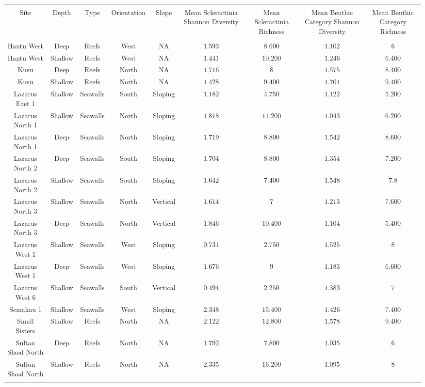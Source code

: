 \documentclass{article}
\begin{document}
\begin{table}[!htbp] \centering 
  \caption*{} 
  \label{} 
\begin{tabular}{@{\extracolsep{5pt}} ccccccccc} 
\\[-1.8ex]\hline 
\hline \\[-1.8ex] 
Site & Depth & Type & Orientation & Slope & Mean Scleractinia Shannon Diversity & Mean Scleractinia Richness & Mean Benthic Category Shannon Diversity & Mean Benthic Category Richness \\ 
\hline \\[-1.8ex] 
Hantu West & Deep & Reefs & West & NA & $1.593$ & $8.600$ & $1.102$ & $6$ \\ 
Hantu West & Shallow & Reefs & West & NA & $1.441$ & $10.200$ & $1.246$ & $6.400$ \\ 
Kusu & Deep & Reefs & North & NA & $1.716$ & $8$ & $1.575$ & $8.400$ \\ 
Kusu & Shallow & Reefs & North & NA & $1.428$ & $9.400$ & $1.701$ & $9.400$ \\ 
Lazarus East 1 & Shallow & Seawalls & South & Sloping & $1.182$ & $4.750$ & $1.122$ & $5.200$ \\ 
Lazarus North 1 & Shallow & Seawalls & North & Sloping & $1.818$ & $11.200$ & $1.043$ & $6.200$ \\ 
Lazarus North 1 & Deep & Seawalls & North & Sloping & $1.719$ & $8.800$ & $1.542$ & $8.600$ \\ 
Lazarus North 2 & Deep & Seawalls & South & Sloping & $1.704$ & $8.800$ & $1.354$ & $7.200$ \\ 
Lazarus North 2 & Shallow & Seawalls & South & Sloping & $1.642$ & $7.400$ & $1.548$ & $7.8$ \\ 
Lazarus North 3 & Shallow & Seawalls & North & Vertical & $1.614$ & $7$ & $1.213$ & $7.600$ \\ 
Lazarus North 3 & Deep & Seawalls & North & Vertical & $1.846$ & $10.400$ & $1.104$ & $5.400$ \\ 
Lazarus West 1 & Shallow & Seawalls & West & Sloping & $0.731$ & $2.750$ & $1.525$ & $8$ \\ 
Lazarus West 1 & Deep & Seawalls & West & Sloping & $1.676$ & $9$ & $1.183$ & $6.600$ \\ 
Lazarus West 6 & Shallow & Seawalls & South & Vertical & $0.494$ & $2.250$ & $1.383$ & $7$ \\ 
Semakau 1 & Shallow & Seawalls & West & Sloping & $2.348$ & $15.400$ & $1.426$ & $7.400$ \\ 
Small Sisters & Shallow & Reefs & North & NA & $2.122$ & $12.800$ & $1.578$ & $9.400$ \\ 
Sultan Shoal North & Deep & Reefs & North & NA & $1.792$ & $7.800$ & $1.035$ & $6$ \\ 
Sultan Shoal North & Shallow & Reefs & North & NA & $2.335$ & $16.200$ & $1.095$ & $8$ \\ 
\hline \\[-1.8ex] 
\end{tabular} 
\end{table} 
\end{document}
